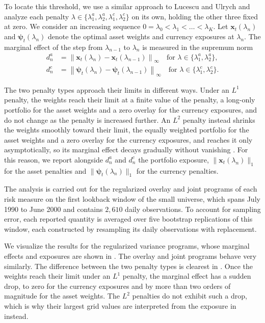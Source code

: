 To locate this threshold, we use a similar approach to Lucescu and Ulrych \cite{RegularizedMultiCurrencyExpectedShortfallPortfolios} and analyze each penalty
$\lambda \in \{\lambda_1^a, \lambda_2^a, \lambda_1^c, \lambda_2^c\}$ on its own, holding the other three fixed at zero. We consider an
increasing sequence $0 = \lambda_0 < \lambda_1 < \dots < \lambda_K$.
Let $\bm{x}_t(\lambda_n)$ and $\bm{\psi}_t(\lambda_n)$ denote the optimal asset weights and currency exposures at
$\lambda_n$. The marginal effect of the step from $\lambda_{n-1}$ to $\lambda_n$ is measured in the supremum norm
\begin{equation*} 
\begin{aligned}
    d_n^a &= \left\| \bm{x}_t(\lambda_n) - \bm{x}_t(\lambda_{n-1}) \right\|_\infty
    \quad \text{for } \lambda \in \{\lambda_1^a, \lambda_2^a\}, \\
    d_n^c &= \left\| \bm{\psi}_t(\lambda_n) - \bm{\psi}_t(\lambda_{n-1}) \right\|_\infty
    \quad \text{for } \lambda \in \{\lambda_1^c, \lambda_2^c\}.
\end{aligned}
\end{equation*} 

The two penalty types approach their limits in different ways. Under an $L^1$ penalty, the weights reach their limit
at a finite value of the penalty, a long-only portfolio for the asset weights and a zero overlay for the currency
exposures, and do not change as the penalty is increased further. An $L^2$ penalty
instead shrinks the weights smoothly toward their limit, the equally weighted portfolio for the asset weights and a
zero overlay for the currency exposures, and reaches it only asymptotically, so its marginal effect decays gradually
without vanishing \cite{HastieTibshiraniFriedman2009}. For this reason, we report alongside $d_n^a$ and $d_n^c$ the
portfolio exposure, $\|\bm{x}_t(\lambda_n)\|_1$ for the asset penalties and $\|\bm{\psi}_t(\lambda_n)\|_1$ for the
currency penalties.

The analysis is carried out for the regularized overlay and joint programs of each risk measure on the first lookback
window of the small universe, which spans July 1990 to June 2000 and contains $2{,}610$ daily observations. To account for sampling error, each reported quantity is averaged over five bootstrap replications of this
window, each constructed by resampling its daily observations with replacement.

We visualize the results for the regularized variance programs, whose marginal effects and exposures are shown in
. The overlay and joint programs
behave very similarly. The difference between the two penalty types is clearest in . Once the
weights reach their limit under an $L^1$ penalty, the marginal effect has a sudden drop, to zero for the currency
exposures and by more than two orders of magnitude for the asset weights. 
The $L^2$ penalties do not exhibit such a drop, which is why their largest grid values are interpreted from the
exposure in  instead.

